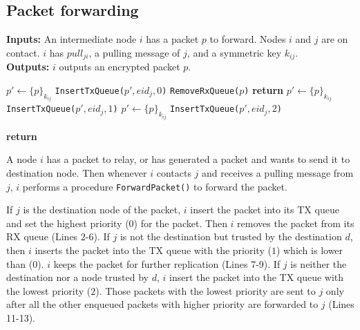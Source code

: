 \documentclass[11pt]{article}
\begin{document}
\subsection{Packet forwarding}

\begin{framed}
\noindent
\textbf{Inputs:} An intermediate node $i$ has a packet $p$ to forward. 
Nodes $i$ and $j$ are on contact.  
$i$ has $pull_{ji}$, a pulling message of $j$, and a symmetric key $k_{ij}$.	\\

\noindent
\textbf{Outputs:} $i$ outputs an encrypted packet $p$.\\

\begin{algorithmic}[1]
	  \State $p' \leftarrow \{p\}_{k_{ij}}$	
	  \State \texttt{InsertTxQueue($p', eid_j, 0$)}
	  \State \texttt{RemoveRxQueue($p$)}
	  \State \textbf{return}
	  \State $p' \leftarrow \{p\}_{k_{ij}}$	
 	  \State \texttt{InsertTxQueue($p', eid_j, 1$)}
 	\Else
	  \State $p' \leftarrow \{p\}_{k_{ij}}$	
 	  \State \texttt{InsertTxQueue($p', eid_j, 2$)}	  
	\EndIf

	\State \textbf{return}
  \EndProcedure
\end{algorithmic}

\end{framed}

A node $i$ has a packet to relay, or has generated a packet and wants to send it to destination node.  
Then whenever $i$ contacts $j$ and receives a pulling message from $j$, $i$ performs a procedure \texttt{ForwardPacket()} to forward the packet. 


If $j$ is the destination node of the packet, $i$ insert the packet into its TX queue and set the highest priority ($0$) for the packet. 
Then $i$ removes the packet from its RX queue (Lines 2-6). 
If $j$ is not the destination but trusted by the destination $d$, then $i$ inserts the packet into the TX queue with the priority ($1$) which is lower than ($0$). 
$i$ keeps the packet for further replication (Lines 7-9).
If $j$ is neither the destination nor a node trusted by $d$, $i$ insert the packet into the TX queue with the lowest priority ($2$). 
Those packets with the lowest priority are sent to $j$ only after all the other enqueued packets with higher priority are forwarded to $j$ (Lines 11-13).
\end{document}

